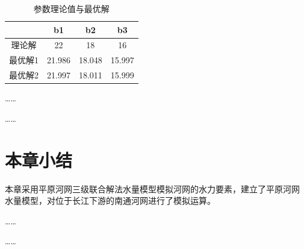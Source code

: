 \begin{table}[H]\small	%
	\centering
	\caption{参数理论值与最优解} \label{tab:parameter}
	\begin{tabular*}{0.75\textwidth}{@{\extracolsep{\fill}}cccc}
		\toprule
		\multicolumn{1}{l}{} & b1     & b2     & b3     \\\midrule
		理论解                  & 22     & 18     & 16     \\
		最优解1                 & 21.986 & 18.048 & 15.997 \\
		最优解2                 & 21.997 & 18.011 & 15.999 \\ \bottomrule
	\end{tabular*}%
\end{table}


……\par
……
\section{本章小结}
本章采用平原河网三级联合解法水量模型模拟河网的水力要素，建立了平原河网
水量模型，对位于长江下游的南通河网进行了模拟运算。\par
……\par
……
